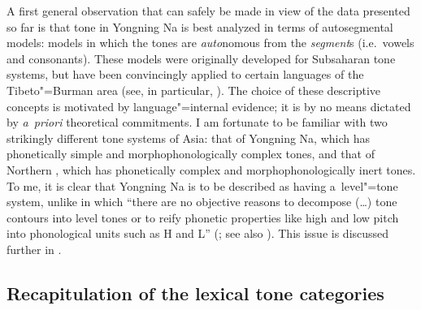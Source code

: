 {{{{{A first general observation that can safely be made in view of the data presented so far is that tone in Yongning Na is best analyzed in terms of autosegmental models: models in which the
tones are \textit{auto}nomous from the \textit{segment}s (i.e.\ vowels and consonants). These models were originally developed for
Subsaharan tone systems, but have been convincingly applied to certain languages of the Tibeto"=Burman area (see,
in particular, \citealt{hymanetal2002a}). The choice of these descriptive concepts is motivated by language"=internal evidence; it is by no means dictated by
\textit{a~priori} theoretical commitments. I am fortunate to be familiar with two strikingly different tone
systems of Asia: that of Yongning Na, which has phonetically simple and morphophonologically complex
tones, and that of Northern , which has phonetically complex and
morphophonologically inert tones. To me, it is clear that Yongning Na is to be described as having
a~level"=tone system, unlike  in which “there are no objective reasons to decompose
({\dots}) tone contours into level tones or to reify phonetic properties like high and low pitch
into phonological units such as H and L” (\citealt{brunelle2009c}; see also
\citealt{brunelleetal2010,kirby2010,kirby2011}). This issue is discussed further in . 


\subsection{Recapitulation of the lexical tone categories}
\label{sec:overviewofthesystem}

}}}}}
